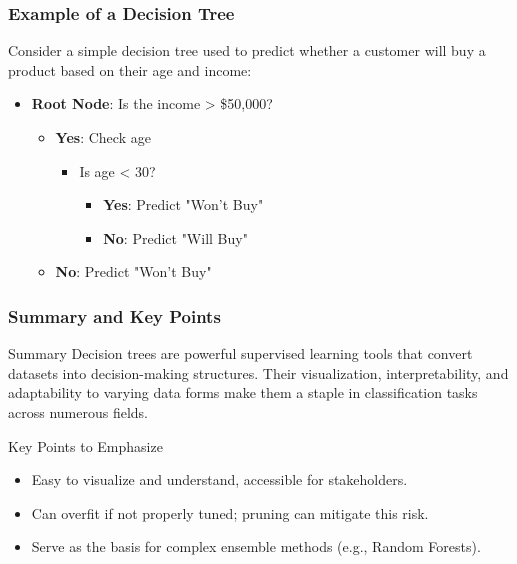 \documentclass[aspectratio=169]{beamer}
\begin{document}
\begin{frame}[fragile]
    \frametitle{Example of a Decision Tree}
    Consider a simple decision tree used to predict whether a customer will buy a product based on their age and income:
    \begin{itemize}
        \item \textbf{Root Node}: Is the income > \$50,000?
        \begin{itemize}
            \item \textbf{Yes}: Check age
            \begin{itemize}
                \item Is age < 30?
                \begin{itemize}
                    \item \textbf{Yes}: Predict "Won't Buy"
                    \item \textbf{No}: Predict "Will Buy"
                \end{itemize}
            \end{itemize}
            \item \textbf{No}: Predict "Won't Buy"
        \end{itemize}
    \end{itemize}
\end{frame}

\begin{frame}[fragile]
    \frametitle{Summary and Key Points}
    \begin{block}{Summary}
        Decision trees are powerful supervised learning tools that convert datasets into decision-making structures. Their visualization, interpretability, and adaptability to varying data forms make them a staple in classification tasks across numerous fields.
    \end{block}
    
    \begin{block}{Key Points to Emphasize}
        \begin{itemize}
            \item Easy to visualize and understand, accessible for stakeholders.
            \item Can overfit if not properly tuned; pruning can mitigate this risk.
            \item Serve as the basis for complex ensemble methods (e.g., Random Forests).
        \end{itemize}
    \end{block}
\end{frame}
\end{document}
